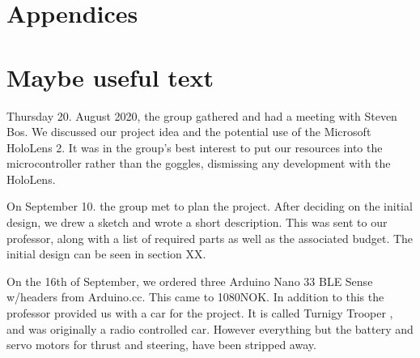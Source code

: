 \documentclass{article}
\begin{document}
\newpage
\section{Appendices}







\newpage
\section{Maybe useful text}

Thursday 20. August 2020, the group gathered and had a meeting with Steven Bos. We discussed our project idea and the potential use of the Microsoft HoloLens 2. It was in the group's best interest to put our resources into the microcontroller rather than the goggles, dismissing any development with the HoloLens.

\vspace{5mm}
On September 10. the group met to plan the project. After deciding on the initial design, we drew a sketch and wrote a short description. This was sent to our professor, along with a list of required parts as well as the associated budget. The initial design can be seen in section XX.

\vspace{5mm}

On the 16th of September, we ordered three Arduino Nano 33 BLE Sense w/headers from Arduino.cc. This came to 1080NOK. In addition to this the professor provided us with a car for the project. It is called Turnigy Trooper \cite{CAR}, and was originally a radio controlled car. However everything but the battery and servo motors for thrust and steering, have been stripped away. 
\end{document}
